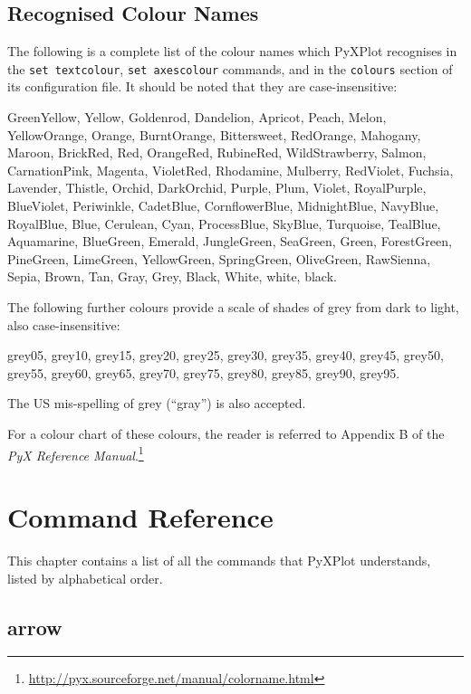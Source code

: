 \documentclass[a4paper,onecolumn,11pt]{book}
\begin{document}
\section{Recognised Colour Names}
\label{colour_names}

The following is a complete list of the colour names which PyXPlot recognises in the \texttt{set textcolour}, \texttt{set axescolour} commands, and in the \texttt{colours} section of its configuration file. It should be noted that they are case-insensitive:

GreenYellow, Yellow, Goldenrod, Dandelion, Apricot, Peach, Melon, YellowOrange, Orange, BurntOrange, Bittersweet, RedOrange, Mahogany, Maroon, BrickRed, Red, OrangeRed, RubineRed, WildStrawberry, Salmon, CarnationPink, Magenta, VioletRed, Rhodamine, Mulberry, RedViolet, Fuchsia, Lavender, Thistle, Orchid, DarkOrchid, Purple, Plum, Violet, RoyalPurple, BlueViolet, Periwinkle, CadetBlue, CornflowerBlue, MidnightBlue, NavyBlue, RoyalBlue, Blue, Cerulean, Cyan, ProcessBlue, SkyBlue, Turquoise, TealBlue, Aquamarine, BlueGreen, Emerald, JungleGreen, SeaGreen, Green, ForestGreen, PineGreen, LimeGreen, YellowGreen, SpringGreen, OliveGreen, RawSienna, Sepia, Brown, Tan, Gray, Grey, Black, White, white, black.

The following further colours provide a scale of shades of grey from dark to light, also case-insensitive:

grey05, grey10, grey15, grey20, grey25, grey30, grey35, grey40, grey45, grey50, grey55, grey60, grey65, grey70, grey75, grey80, grey85, grey90, grey95.

The US mis-spelling of grey (``gray'') is also accepted.

For a colour chart of these colours, the reader is referred to Appendix B of the \textit{PyX Reference Manual}.\footnote{\url{http://pyx.sourceforge.net/manual/colorname.html}}

\chapter{Command Reference}

This chapter contains a list of all the commands that PyXPlot understands,
listed by alphabetical order.

\section{arrow}
\end{document}
